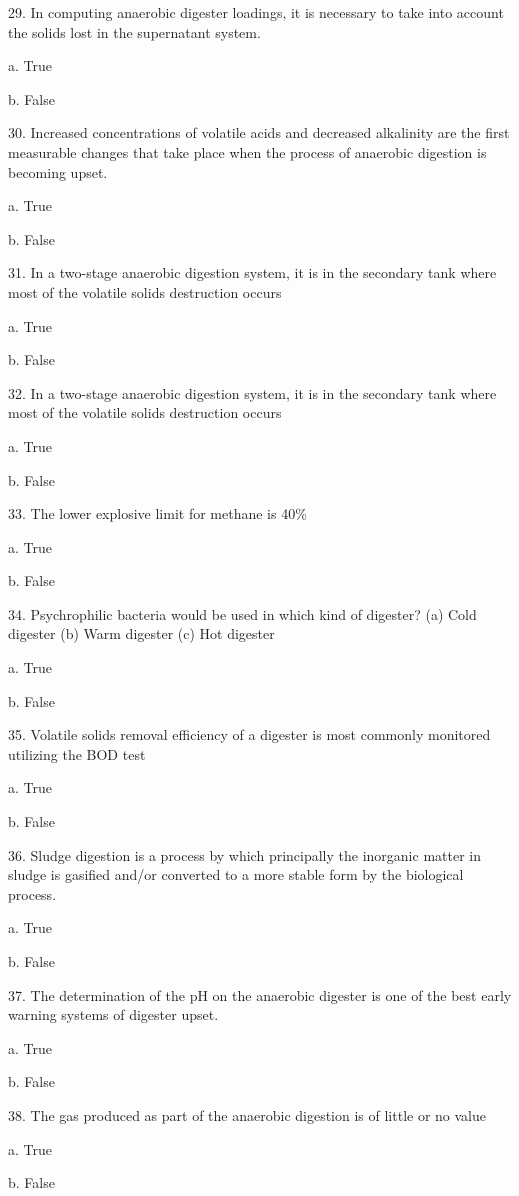 \documentclass{article}
\begin{document}
29. In computing anaerobic digester loadings, it is necessary to take into account the solids lost in the supernatant system. 

a. True 

b. False 


30. Increased concentrations of volatile acids and decreased alkalinity are the first measurable changes that take place when the process of anaerobic digestion is becoming upset. 

a. True 

b. False 


31. In a two-stage anaerobic digestion system, it is in the secondary tank where most of the volatile solids destruction occurs 

a. True 

b. False 


32. In a two-stage anaerobic digestion system, it is in the secondary tank where most of the volatile solids destruction occurs 

a. True 

b. False 


33. The lower explosive limit for methane is 40\% 

a. True 

b. False 


34. Psychrophilic bacteria would be used in which kind of digester?
(a) Cold digester
(b) Warm digester
(c) Hot digester 

a. True 

b. False 


35. Volatile solids removal efficiency of a digester is most commonly monitored utilizing the BOD test

a. True 

b. False 


36. Sludge digestion is a process by which principally the inorganic matter in sludge is gasified and/or converted to a more stable form by the biological process. 

a. True 

b. False 


37. The determination of the pH on the anaerobic digester is one of the best early warning systems of digester upset. 

a. True 

b. False 


38. The gas produced as part of the anaerobic digestion is of little or no value 

a. True 

b. False 
\end{document}
